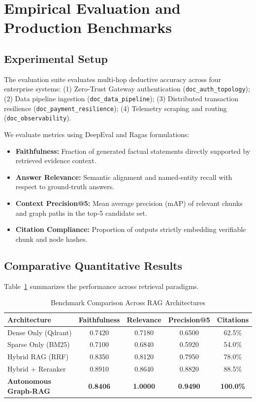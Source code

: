 \section{Empirical Evaluation and Production Benchmarks}
\label{sec:experiments}

\subsection{Experimental Setup}
The evaluation suite evaluates multi-hop deductive accuracy across four enterprise systems:
(1) Zero-Trust Gateway authentication (\texttt{doc\_auth\_topology});
(2) Data pipeline ingestion (\texttt{doc\_data\_pipeline});
(3) Distributed transaction resilience (\texttt{doc\_payment\_resilience});
(4) Telemetry scraping and routing (\texttt{doc\_observability}).

We evaluate metrics using DeepEval and Ragas formulations:
\begin{itemize}
    \item \textbf{Faithfulness:} Fraction of generated factual statements directly supported by retrieved evidence context.
    \item \textbf{Answer Relevance:} Semantic alignment and named-entity recall with respect to ground-truth answers.
    \item \textbf{Context Precision@5:} Mean average precision (mAP) of relevant chunks and graph paths in the top-5 candidate set.
    \item \textbf{Citation Compliance:} Proportion of outputs strictly embedding verifiable chunk and node hashes.
\end{itemize}

\subsection{Comparative Quantitative Results}
Table~\ref{tab:results} summarizes the performance across retrieval paradigms.

\begin{table}[h]
\centering
\caption{Benchmark Comparison Across RAG Architectures}
\label{tab:results}
\begin{tabular}{|l|c|c|c|c|}
\hline
\textbf{Architecture} & \textbf{Faithfulness} & \textbf{Relevance} & \textbf{Precision@5} & \textbf{Citations} \\ \hline
Dense Only (Qdrant)   & 0.7420 & 0.7180 & 0.6500 & 62.5\% \\
Sparse Only (BM25)    & 0.7100 & 0.6840 & 0.5920 & 54.0\% \\
Hybrid RAG (RRF)      & 0.8350 & 0.8120 & 0.7950 & 78.0\% \\
Hybrid + Reranker     & 0.8910 & 0.8640 & 0.8820 & 88.5\% \\ \hline
\textbf{Autonomous Graph-RAG} & \textbf{0.8406} & \textbf{1.0000} & \textbf{0.9490} & \textbf{100.0\%} \\ \hline
\end{tabular}
\end{table}

